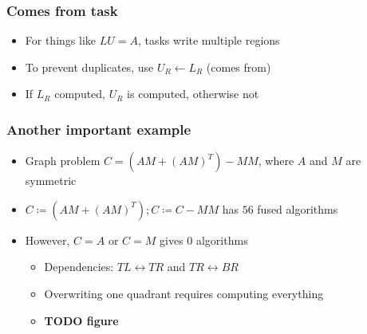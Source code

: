 \documentclass{beamer}
\begin{document}
\begin{frame}
  \frametitle{Comes from task}
  \begin{itemize}
  \item For things like $LU = A$, tasks write multiple regions
  \item To prevent duplicates, use $U_R \leftarrow L_R$ (comes from)
  \item If $L_R$ computed, $U_R$ is computed, otherwise not
  \end{itemize}
\end{frame}

\begin{frame}
  \frametitle{Another important example}
  \begin{itemize}
  \item Graph problem $C = (AM + (AM)^T) - MM$, where $A$ and $M$ are symmetric
  \item $C \coloneqq (AM + (AM)^T); C \coloneqq C - MM$ has $56$ fused algorithms
  \item However, $C = A$ or $C = M$ gives $0$ algorithms
    \begin{itemize}
    \item Dependencies: $TL \leftrightarrow TR$ and $TR \leftrightarrow BR$
    \item Overwriting one quadrant requires computing everything
    \item \textbf{TODO figure}
    \end{itemize}
  \end{itemize}
\end{frame}
\end{document}
